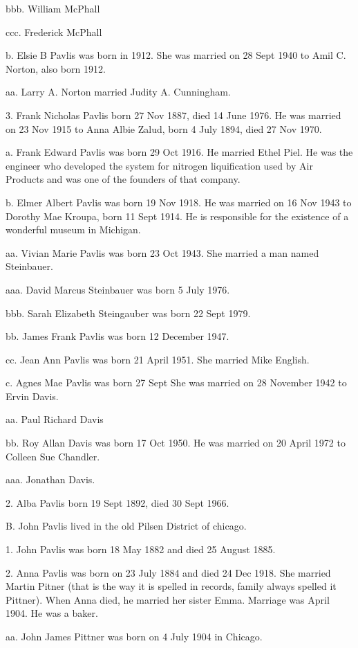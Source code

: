 \documentclass[a4paper]{article}
\begin{document}
bbb. William McPhall 

ccc. Frederick McPhall

b. Elsie B Pavlis was born in 1912.  She was married on 28 Sept 1940 to Amil C. Norton, also born 1912. 

aa. Larry A. Norton married Judity A. Cunningham.  

3. Frank Nicholas Pavlis born 27 Nov 1887, died 14 June 1976.  He was married on 23 Nov 1915 to Anna Albie Zalud, born 4 July 1894, died 27 Nov 1970.  

a. Frank Edward Pavlis was born 29 Oct 1916.  He married Ethel Piel. He was the engineer who developed the system for nitrogen liquification used by Air Products and was one of the founders of that company.

b. Elmer Albert Pavlis was born 19 Nov 1918.  He was married on 16 Nov 1943 to Dorothy Mae Kroupa, born 11 Sept 1914.  He is responsible for the existence of a wonderful museum in Michigan.

aa. Vivian Marie Pavlis was born 23 Oct 1943.  She married a man named Steinbauer.

aaa. David Marcus Steinbauer was born 5 July 1976.

bbb. Sarah Elizabeth Steingauber was born 22 Sept 1979.

bb. James Frank Pavlis was born 12 December 1947.

cc. Jean Ann Pavlis was born 21 April 1951.  She married Mike English.  

c. Agnes Mae Pavlis was born 27 Sept She was married on 28 November 1942 to Ervin Davis.  

aa.  Paul Richard Davis

bb. Roy Allan Davis was born 17 Oct 1950.  He was married on 20 April 1972 to Colleen Sue Chandler.  

aaa. Jonathan Davis. 

2. Alba Pavlis born 19 Sept 1892, died 30 Sept 1966.    

B. John Pavlis lived in the old Pilsen District of chicago.  

1. John Pavlis was born 18 May 1882 and died 25 August 1885.

2. Anna Pavlis was born on 23 July 1884 and died 24 Dec 1918.  She married Martin Pitner (that is the way it is spelled in records, family always spelled it Pittner).  When Anna died, he married her sister Emma.  Marriage was April 1904.  He was a baker.  

aa. John James Pittner was born on 4 July 1904 in Chicago.
\end{document}
